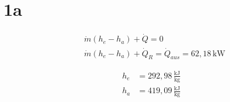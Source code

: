 

\section*{1a}

\begin{align*}
&\dot{m}(h_e - h_a) + \dot{Q} = 0 \\
&\dot{m}(h_e - h_a) + \dot{Q}_R = \dot{Q}_{aus} = 62,18 \, \text{kW}
\end{align*}

\begin{align*}
h_e &= 292,98 \, \frac{\text{kJ}}{\text{kg}} \\
h_a &= 419,09 \, \frac{\text{kJ}}{\text{kg}}
\end{align*}